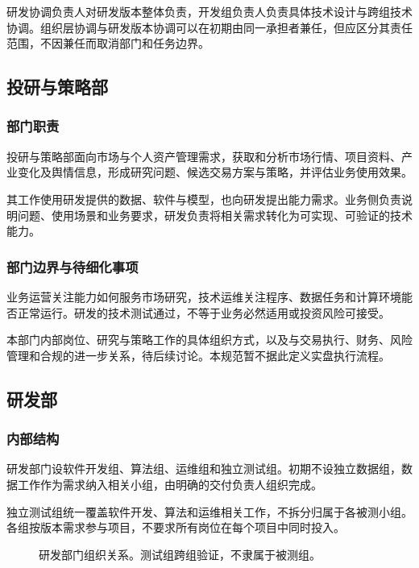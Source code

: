 \documentclass[11pt,a4paper]{article}
\begin{document}
研发协调负责人对研发版本整体负责，开发组负责人负责具体技术设计与跨组技术协调。组织层协调与研发版本协调可以在初期由同一承担者兼任，但应区分其责任范围，不因兼任而取消部门和任务边界。

\subsection{投研与策略部}
\subsubsection{部门职责}
投研与策略部面向市场与个人资产管理需求，获取和分析市场行情、项目资料、产业变化及舆情信息，形成研究问题、候选交易方案与策略，并评估业务使用效果。

其工作使用研发提供的数据、软件与模型，也向研发提出能力需求。业务侧负责说明问题、使用场景和业务要求，研发负责将相关需求转化为可实现、可验证的技术能力。

\subsubsection{部门边界与待细化事项}
业务运营关注能力如何服务市场研究，技术运维关注程序、数据任务和计算环境能否正常运行。研发的技术测试通过，不等于业务必然适用或投资风险可接受。

本部门内部岗位、研究与策略工作的具体组织方式，以及与交易执行、财务、风险管理和合规的进一步关系，待后续讨论。本规范暂不据此定义实盘执行流程。

\subsection{研发部}
\subsubsection{内部结构}

研发部门设软件开发组、算法组、运维组和独立测试组。初期不设独立数据组，数据工作作为需求纳入相关小组，由明确的交付负责人组织完成。

独立测试组统一覆盖软件开发、算法和运维相关工作，不拆分归属于各被测小组。各组按版本需求参与项目，不要求所有岗位在每个项目中同时投入。

\begin{figure}[H]
\centering
{}
\caption{研发部门组织关系。测试组跨组验证，不隶属于被测组。}
\end{figure}
\end{document}
